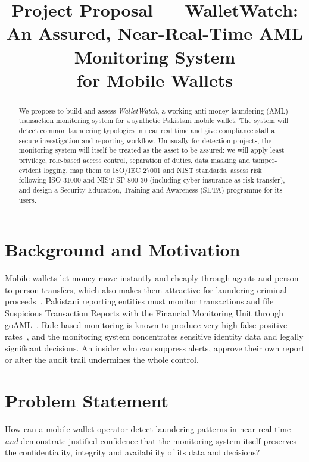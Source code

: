 \documentclass[conference,10pt]{IEEEtran}
\begin{document}
\title{Project Proposal --- WalletWatch:\\An Assured, Near-Real-Time AML Monitoring System\\for Mobile Wallets}

\author{
}

\maketitle

\begin{abstract}
We propose to build and assess \emph{WalletWatch}, a working anti-money-laundering (AML) transaction
monitoring system for a synthetic Pakistani mobile wallet. The system will detect common laundering
typologies in near real time and give compliance staff a secure investigation and reporting
workflow. Unusually for detection projects, the monitoring system will itself be treated as the
asset to be assured: we will apply least privilege, role-based access control, separation of
duties, data masking and tamper-evident logging, map them to ISO/IEC 27001 and NIST standards,
assess risk following ISO 31000 and NIST SP 800-30 (including cyber insurance as risk transfer), and
design a Security Education, Training and Awareness (SETA) programme for its users.
\end{abstract}

\section{Background and Motivation}
Mobile wallets let money move instantly and cheaply through agents and person-to-person transfers,
which also makes them attractive for laundering criminal proceeds~\cite{fatf2013npps}. Pakistani
reporting entities must monitor transactions and file Suspicious Transaction Reports with the
Financial Monitoring Unit through goAML~\cite{amla2010,fmu2021ctr}. Rule-based monitoring is known to
produce very high false-positive rates~\cite{deloitte2020tm}, and the monitoring system concentrates
sensitive identity data and legally significant decisions. An insider who can suppress alerts,
approve their own report or alter the audit trail undermines the whole control.

\section{Problem Statement}
How can a mobile-wallet operator detect laundering patterns in near real time \emph{and} demonstrate
justified confidence that the monitoring system itself preserves the confidentiality, integrity and
availability of its data and decisions?
\end{document}
